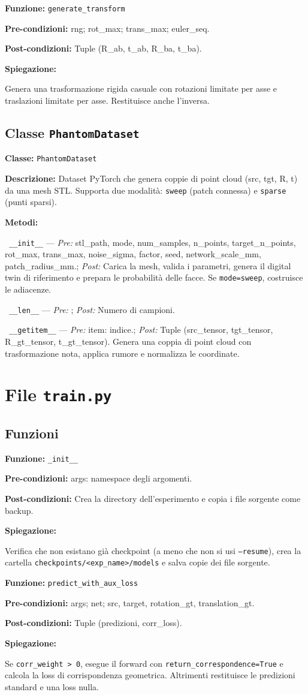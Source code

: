 \documentclass[11pt,a4paper]{article}
\newenvironment{functionspec}[3]{%
    \par\medskip\noindent
    \textbf{Funzione:} \texttt{#1}\par
    \textbf{Pre-condizioni:} #2\par
    \textbf{Post-condizioni:} #3\par
    \textbf{Spiegazione:}\par\noindent\ignorespaces
}{%
    \par\medskip
}
\newenvironment{classspec}[2]{%
    \par\medskip\noindent
    \textbf{Classe:} \texttt{#1}\par
    \textbf{Descrizione:} #2\par
    \textbf{Metodi:}\par
    \begingroup
    \setlength{\parindent}{0pt}%
    \setlength{\parskip}{2pt}%
}{%
    \endgroup
    \par\medskip
}
\newcommand{\method}[3]{%
    \noindent\hspace*{1.2em}\textbullet~\texttt{#1} --- \textit{Pre:} #2; \textit{Post:} #3\par
}
\begin{document}
\begin{functionspec}{generate\_transform}{rng; rot\_max; trans\_max; euler\_seq.}{Tuple (R\_ab, t\_ab, R\_ba, t\_ba).}
Genera una trasformazione rigida casuale con rotazioni limitate per asse e traslazioni limitate per asse. Restituisce anche l'inversa.
\end{functionspec}

\subsection{Classe \texttt{PhantomDataset}}

\begin{classspec}{PhantomDataset}{Dataset PyTorch che genera coppie di point cloud (src, tgt, R, t) da una mesh STL. Supporta due modalità: \texttt{sweep} (patch connessa) e \texttt{sparse} (punti sparsi).}
\method{\_\_init\_\_}{stl\_path, mode, num\_samples, n\_points, target\_n\_points, rot\_max, trans\_max, noise\_sigma, factor, seed, network\_scale\_mm, patch\_radius\_mm.}{Carica la mesh, valida i parametri, genera il digital twin di riferimento e prepara le probabilità delle facce. Se \texttt{mode=sweep}, costruisce le adiacenze.}
\method{\_\_len\_\_}{}{Numero di campioni.}
\method{\_\_getitem\_\_}{item: indice.}{Tuple (src\_tensor, tgt\_tensor, R\_gt\_tensor, t\_gt\_tensor). Genera una coppia di point cloud con trasformazione nota, applica rumore e normalizza le coordinate.}
\end{classspec}

\section{File \texttt{train.py}}

\subsection{Funzioni}

\begin{functionspec}{\_init\_\_}{args: namespace degli argomenti.}{Crea la directory dell'esperimento e copia i file sorgente come backup.}
Verifica che non esistano già checkpoint (a meno che non si usi \texttt{--resume}), crea la cartella \texttt{checkpoints/<exp\_name>/models} e salva copie dei file sorgente.
\end{functionspec}

\begin{functionspec}{predict\_with\_aux\_loss}{args; net; src, target, rotation\_gt, translation\_gt.}{Tuple (predizioni, corr\_loss).}
Se \texttt{corr\_weight > 0}, esegue il forward con \texttt{return\_correspondence=True} e calcola la loss di corrispondenza geometrica. Altrimenti restituisce le predizioni standard e una loss nulla.
\end{functionspec}
\end{document}
